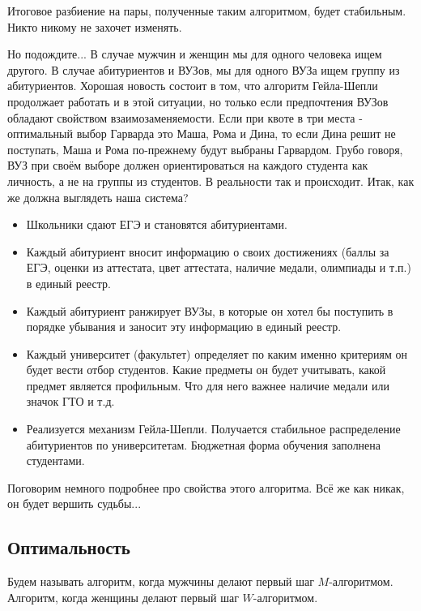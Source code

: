 \documentclass[pdftex, 11pt, a4paper]{article}
\begin{document}
Итоговое разбиение на пары, полученные таким алгоритмом, будет стабильным. Никто никому не захочет изменять. 

Но подождите... В случае мужчин и женщин мы для одного человека ищем другого. В случае абитуриентов и ВУЗов, мы для одного ВУЗа ищем группу из абитуриентов. Хорошая новость состоит в том, что алгоритм Гейла-Шепли продолжает работать и в этой ситуации, но только если предпочтения ВУЗов обладают свойством взаимозаменяемости. Если при квоте в три места - оптимальный выбор Гарварда это Маша, Рома и Дина, то если Дина решит не поступать, Маша и Рома по-прежнему будут выбраны Гарвардом.  Грубо говоря, ВУЗ при своём выборе должен ориентироваться на каждого студента как личность, а не на группы из студентов. В реальности так и происходит. Итак, как же должна выглядеть наша система? 

\begin{itemize}
\item Школьники сдают ЕГЭ и становятся абитуриентами. 

\item Каждый абитуриент вносит информацию о своих достижениях (баллы за ЕГЭ, оценки из аттестата, цвет аттестата, наличие медали, олимпиады и т.п.) в единый реестр. 

\item Каждый абитуриент ранжирует ВУЗы, в которые он хотел бы поступить в порядке убывания и заносит эту информацию в единый реестр.

\item Каждый университет (факультет) определяет по каким именно критериям он будет вести отбор студентов. Какие предметы он будет учитывать, какой предмет является профильным. Что для него важнее наличие медали или значок ГТО и т.д. 

\item Реализуется механизм Гейла-Шепли. Получается стабильное распределение абитуриентов по университетам. Бюджетная форма обучения заполнена студентами. 
\end{itemize}

Поговорим немного подробнее про свойства этого алгоритма. Всё же как никак, он будет вершить судьбы... 

\subsection*{Оптимальность}

Будем называть алгоритм, когда мужчины делают первый шаг $M$-алгоритмом. Алгоритм, когда женщины делают первый шаг $W$-алгоритмом. 
\end{document}
